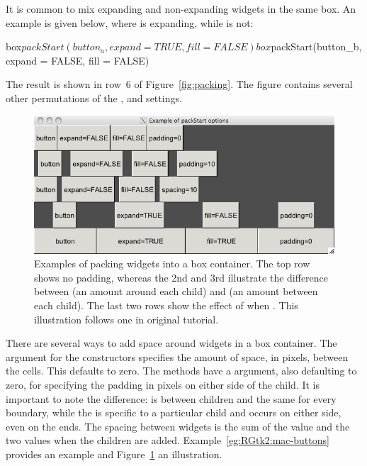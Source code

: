 It is common to mix expanding and non-expanding widgets in the same
box.
An example is given below, where  is expanding,
while  is not:
%
\begin{Schunk}
\begin{Sinput}
 box$packStart(button_a, expand = TRUE, fill = FALSE)
 box$packStart(button_b, expand = FALSE, fill = FALSE)
\end{Sinput}
\end{Schunk}
%
The result is shown in row~6 of Figure~\ref{fig:packing}.  The figure
contains several other permutations of the
,
 and
 settings.

\begin{figure}
  \centering
  \includegraphics[width=.85\textwidth]{ex-RGtk2-pack-start}
  \caption{Examples of packing widgets into a box container. The top
    row shows no padding, whereas the 2nd and 3rd illustrate the
    difference between  (an amount around each child)
    and  (an amount between each child). The last two
    rows show the effect of  when . This
    illustration follows one in original \GTK\/ tutorial.}
  \label{fig:RGtk2-pack-start}
\end{figure}

There are several ways to add space around widgets in a box container.
The  argument for the constructors
specifies the amount of space, in pixels, between the cells. This
defaults to zero. The  methods have a
 argument, also defaulting to zero,
for specifying the padding in pixels on either side of the child. It
is important to note the difference:  is between
children and the same for every boundary, while the  is
specific to a particular child and occurs on either side, even on the
ends. The spacing between widgets is the sum of the 
value and the two  values when the children are added.
Example~\ref{eg:RGtk2:mac-buttons} provides an example and
Figure~\ref{fig:RGtk2-pack-start} an illustration.

